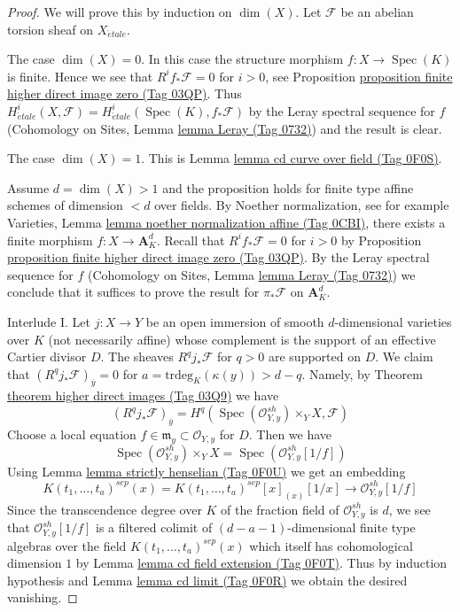 \documentclass{amsart}
\theoremstyle{plain}
\theoremstyle{definition}
\theoremstyle{remark}
\numberwithin{equation}{subsection}
\def\Spec{\mathop{\mathrm{Spec}}}
\def\etale{{\acute{e}tale}}
\begin{document}
\begin{proof}
We will prove this by induction on $\dim(X)$.
Let $\mathcal{F}$ be an abelian torsion sheaf on $X_\etale$.

\medskip\noindent
The case $\dim(X) = 0$. In this case the structure morphism
$f : X \to \Spec(K)$ is finite. Hence we see that $R^if_*\mathcal{F} = 0$
for $i > 0$, see Proposition \href{https://stacks.math.columbia.edu/tag/03QP}{proposition finite higher direct image zero (Tag 03QP)}.
Thus $H^i_\etale(X, \mathcal{F}) = H^i_\etale(\Spec(K), f_*\mathcal{F})$
by the Leray spectral sequence for $f$
(Cohomology on Sites, Lemma \href{https://stacks.math.columbia.edu/tag/0732}{lemma Leray (Tag 0732)})
and the result is clear.

\medskip\noindent
The case $\dim(X) = 1$. This is Lemma \href{https://stacks.math.columbia.edu/tag/0F0S}{lemma cd curve over field (Tag 0F0S)}.

\medskip\noindent
Assume $d = \dim(X) > 1$ and the proposition holds for finite type
affine schemes of dimension $< d$ over fields.
By Noether normalization, see for example
Varieties, Lemma \href{https://stacks.math.columbia.edu/tag/0CBI}{lemma noether normalization affine (Tag 0CBI)},
there exists a finite morphism $f : X \to \mathbf{A}^d_K$.
Recall that $R^if_*\mathcal{F} = 0$ for $i > 0$ by
Proposition \href{https://stacks.math.columbia.edu/tag/03QP}{proposition finite higher direct image zero (Tag 03QP)}.
By the Leray spectral sequence for $f$
(Cohomology on Sites, Lemma \href{https://stacks.math.columbia.edu/tag/0732}{lemma Leray (Tag 0732)})
we conclude that it suffices to prove the result for $\pi_*\mathcal{F}$
on $\mathbf{A}^d_K$.

\medskip\noindent
Interlude I. Let $j : X \to Y$ be an open immersion of smooth
$d$-dimensional varieties over $K$ (not necessarily affine)
whose complement is the support of an effective Cartier divisor $D$.
The sheaves $R^qj_*\mathcal{F}$ for $q > 0$ are supported on $D$.
We claim that $(R^qj_*\mathcal{F})_{\overline{y}} = 0$
for $a = \text{trdeg}_K(\kappa(y)) > d - q$. Namely, by
Theorem \href{https://stacks.math.columbia.edu/tag/03Q9}{theorem higher direct images (Tag 03Q9)} we have
$$
(R^qj_*\mathcal{F})_{\overline{y}} =
H^q(\Spec(\mathcal{O}_{Y, y}^{sh}) \times_Y X, \mathcal{F})
$$
Choose a local equation $f \in \mathfrak m_y \subset \mathcal{O}_{Y, y}$
for $D$. Then we have
$$
\Spec(\mathcal{O}_{Y, y}^{sh}) \times_Y X =
\Spec(\mathcal{O}_{Y, y}^{sh}[1/f])
$$
Using Lemma \href{https://stacks.math.columbia.edu/tag/0F0U}{lemma strictly henselian (Tag 0F0U)} we get an embedding
$$
K(t_1, \ldots, t_a)^{sep}(x) =
K(t_1, \ldots, t_a)^{sep}[x]_{(x)}[1/x]
\longrightarrow
\mathcal{O}_{Y, y}^{sh}[1/f]
$$
Since the transcendence degree over $K$ of the fraction field of
$\mathcal{O}_{Y, y}^{sh}$ is $d$, we see that $\mathcal{O}_{Y, y}^{sh}[1/f]$
is a filtered colimit of $(d - a - 1)$-dimensional finite type algebras over
the field $K(t_1, \ldots, t_a)^{sep}(x)$ which itself has cohomological
dimension $1$ by Lemma \href{https://stacks.math.columbia.edu/tag/0F0T}{lemma cd field extension (Tag 0F0T)}. Thus by induction
hypothesis and Lemma \href{https://stacks.math.columbia.edu/tag/0F0R}{lemma cd limit (Tag 0F0R)}
we obtain the desired vanishing.


\end{proof}
\end{document}
